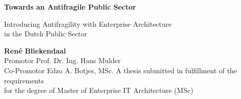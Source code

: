 \begin{titlepage}
	\begin{center}
		\vspace*{1cm}
		\Huge
		\textbf{Towards an Antifragile Public Sector}
		
		\vspace{0.9cm}
		\large
		
		Introducing Antifragility with Enterprise Architecture\\%
		in the Dutch Public Sector
		
		\vspace{1.5cm}
		\Large
		\textbf{René Bliekendaal}\\
		\vspace{0.8cm}
		Promotor Prof. Dr. Ing. Hans Mulder\\
		Co-Promotor Edzo A. Botjes, MSc.		
		\vfill
		\large
		A thesis submitted in fulfillment of the requirements\\
		for the degree of Master of Enterprise IT Architecture (MSc)
		

\end{center}
\end{titlepage}
